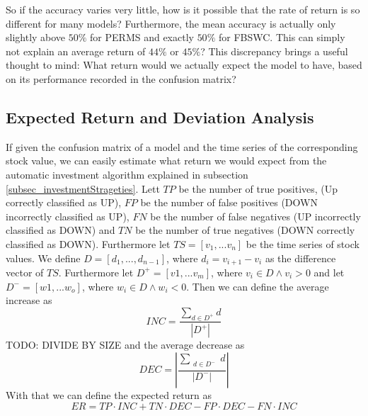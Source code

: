  So if the accuracy varies very little, how is it possible that the rate of return is so different for many models? Furthermore, the mean accuracy is actually only slightly above $50\%$ for PERMS and exactly $50\%$ for FBSWC. This can simply not explain an average return of $44\%$ or $45\%$? This discrepancy brings a useful thought to mind: What return would we actually expect the model to have, based on its performance recorded in the confusion matrix? \\

\subsection{Expected Return and Deviation Analysis}
If given the confusion matrix of a model and the time series of the corresponding stock value, we can easily estimate what return we would expect from the automatic investment algorithm explained in subsection \ref{subsec_investmentStrageties}. Lett $TP$ be the number of true positives, (Up correctly classified as UP), $FP$ be the number of false positives (DOWN incorrectly classified as UP), $FN$ be the number of false negatives (UP incorrectly classified as DOWN) and $TN$ be the number of true negatives (DOWN correctly classified as DOWN). Furthermore let $TS = [v_1,...v_n]$ be the time series of stock values. We define $D = [d_1,...,d_{n-1}]$, where $d_i = v_{i+1} - v_i$ as the difference vector of $TS$. Furthermore let $D^+ = [v1,...v_m]$, where $v_i \in D \land v_i > 0$ and let $D^- = [w1,...w_o]$, where $w_i \in D \land w_i < 0$.  Then we can define the average increase as \[INC  = \frac{\sum_{d \in D^+} d}{|D^+|} \] TODO: DIVIDE BY SIZE and the average decrease as \[ DEC = |\frac{\sum_{\substack{d \in D^-}} d}{|D^-|}| \]
With that we can define the expected return as \[ER  = TP \cdot INC + TN \cdot DEC - FP \cdot DEC - FN \cdot INC \]

